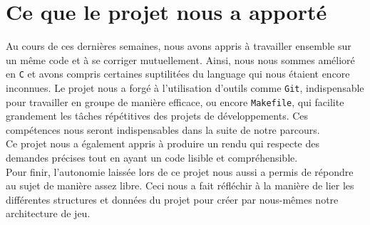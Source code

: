 \section{Ce que le projet nous a apporté}
    Au cours de ces dernières semaines, nous avons appris à travailler ensemble sur un même code et à se corriger mutuellement. Ainsi, nous nous sommes amélioré en \texttt{C} et avons compris certaines suptilitées du language qui nous étaient encore inconnues. Le projet nous a forgé à l'utilisation d'outils comme \texttt{Git}, indispensable pour travailler en groupe de manière efficace, ou encore \texttt{Makefile}, qui facilite grandement les tâches répétitives des projets de développements. Ces compétences nous seront indispensables dans la suite de notre parcours.  \\
    Ce projet nous a également appris à produire un rendu qui respecte des demandes précises tout en ayant un code lisible et compréhensible. \\
    Pour finir, l'autonomie laissée lors de ce projet nous aussi a permis de répondre au sujet de manière assez libre. Ceci nous a fait réfléchir à la manière de lier les différentes structures et données du projet pour créer par nous-mêmes notre architecture de jeu.